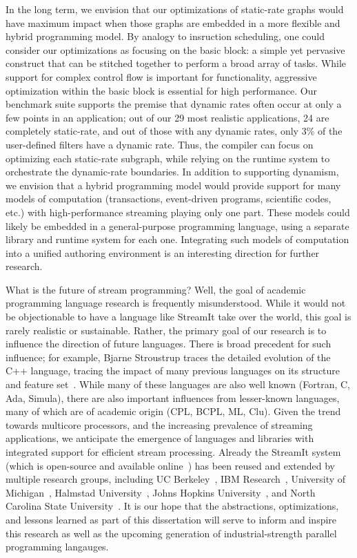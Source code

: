 In the long term, we envision that our optimizations of static-rate
graphs would have maximum impact when those graphs are embedded in a
more flexible and hybrid programming model.  By analogy to insruction
scheduling, one could consider our optimizations as focusing on the
basic block: a simple yet pervasive construct that can be stitched
together to perform a broad array of tasks.  While support for complex
control flow is important for functionality, aggressive optimization
within the basic block is essential for high performance.  Our
benchmark suite supports the premise that dynamic rates often occur at
only a few points in an application; out of our 29 most realistic
applications, 24 are completely static-rate, and out of those with any
dynamic rates, only 3\% of the user-defined filters have a dynamic
rate.  Thus, the compiler can focus on optimizing each static-rate
subgraph, while relying on the runtime system to orchestrate the
dynamic-rate boundaries.  In addition to supporting dynamism, we
envision that a hybrid programming model would provide support for
many models of computation (transactions, event-driven programs,
scientific codes, etc.) with high-performance streaming playing only
one part.  These models could likely be embedded in a general-purpose
programming language, using a separate library and runtime system for
each one.  Integrating such models of computation into a unified
authoring environment is an interesting direction for further
research.

What is the future of stream programming?  Well, the goal of academic
programming language research is frequently misunderstood.  While it
would not be objectionable to have a language like StreamIt take over
the world, this goal is rarely realistic or sustainable.  Rather, the
primary goal of our research is to influence the direction of future
languages.  There is broad precedent for such influence; for example,
Bjarne Stroustrup traces the detailed evolution of the C++ language,
tracing the impact of many previous languages on its structure and
feature set~\cite{stroustrup_design_1994}.  While many of these
languages are also well known (Fortran, C, Ada, Simula), there are
also important influences from lesser-known languages, many of which
are of academic origin (CPL, BCPL, ML, Clu).  Given the trend towards
multicore processors, and the increasing prevalence of streaming
applications, we anticipate the emergence of languages and libraries
with integrated support for efficient stream processing.  Already the
StreamIt system (which is open-source and available
online~\cite{streamitweb}) has been reused and extended by multiple
research groups, including UC
Berkeley~\cite{mani-permutations,bit-streaming}, IBM Research~\cite{},
University of Michigan~\cite{??}, Halmstad
University~\cite{ola-techrep}, Johns Hopkins
University~\cite{duca-thesis}, and North Carolina State
University~\cite{won-thesis}.  It is our hope that the abstractions,
optimizations, and lessons learned as part of this dissertation will
serve to inform and inspire this research as well as the upcoming
generation of industrial-strength parallel programming langauges.


